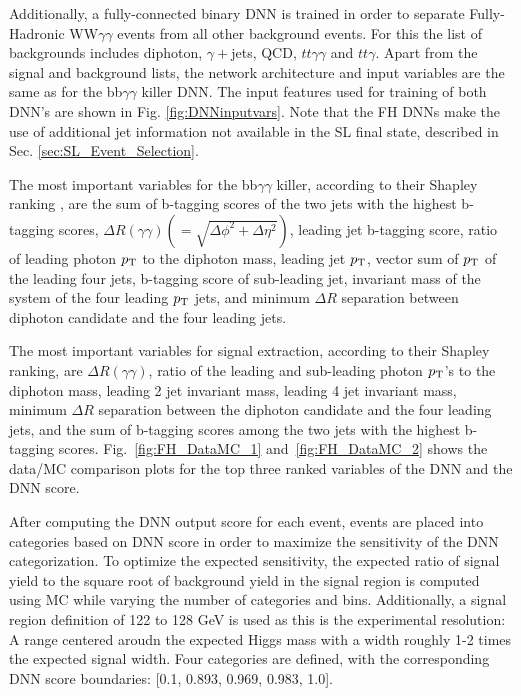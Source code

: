 Additionally, a fully-connected binary DNN is trained in order to separate Fully-Hadronic WW$\gamma\gamma$ events from all other background events.
For this the list of backgrounds includes diphoton, $\gamma+$jets, QCD, $tt\gamma\gamma$ and $tt\gamma$.
Apart from the signal and background lists, the network architecture and input variables are the same as for the bb$\gamma\gamma$ killer DNN. The input features 
used for training of both DNN's are shown in Fig. \ref{fig:DNNinputvars}. Note that the FH DNNs make the use of additional jet information not available in the SL final state, described in Sec. \ref{sec:SL_Event_Selection}. 

The most important variables for the bb$\gamma\gamma$ killer, according to their Shapley ranking \cite{shapley_values}, are
the sum of b-tagging scores of the two jets with the highest b-tagging scores, $\Delta R (\gamma\gamma) (=\sqrt{\Delta \phi^2 + \Delta \eta^2})$,
leading jet b-tagging score, ratio of leading photon $p_{\mathrm{T}}$ to the diphoton mass, leading jet $p_{\mathrm{T}}$,  vector sum of $p_{\mathrm{T}}$ of the leading four jets,
b-tagging score of sub-leading jet, invariant mass of the system of the four leading $p_{\mathrm{T}}$ jets, and minimum $\Delta R$ separation between
diphoton candidate and the four leading jets.

The most important variables for signal extraction, according to their Shapley ranking, are $\Delta R (\gamma\gamma)$, 
ratio of the leading and sub-leading photon $p_{\mathrm{T}}$'s to the diphoton mass,
leading 2 jet invariant mass, leading 4 jet invariant mass, minimum $\Delta R$ separation between
the diphoton candidate and the four leading jets, and the sum of b-tagging scores among the two jets with the highest
b-tagging scores. Fig.~\ref{fig:FH_DataMC_1} and~\ref{fig:FH_DataMC_2} shows the data/MC comparison plots for the top three ranked variables of the DNN and the DNN score.

After computing the DNN output score for each event, events are placed into categories based on DNN score in order to maximize the sensitivity of the DNN categorization. 
To optimize the expected sensitivity, the expected ratio of signal yield to the square root of background yield in the signal region is computed using MC while varying the number of categories and bins. 
Additionally, a signal region definition of 122 to 128 GeV is used as this is the experimental resolution: A range centered aroudn the expected Higgs mass with a width roughly 1-2 times 
the expected signal width. Four categories are defined, with the corresponding DNN score boundaries: [0.1, 0.893, 0.969, 0.983, 1.0].

